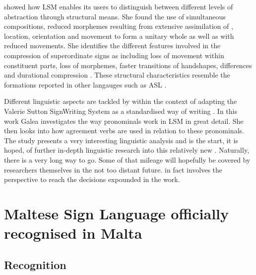 \documentclass[output=paper]{langsci/langscibook}
\begin{document}
\citet{m10} showed how LSM enables its users to distinguish
between different levels of abstraction through structural means.  She
found the use of simultaneous  compositions, reduced morphemes
resulting from extensive assimilation of , location,
orientation and movement to form a unitary whole as well as
 with reduced movements.  She identifies the different
features involved in the compression of superordinate signs as
including loss of movement within constituent parts, loss of
morphemes, faster transitions of handshapes,  differences and
durational compression \citep[150]{m10}.  These structural
characteristics resemble the  formations reported in other 
langauges such as ASL \citep[225 ff]{KB79}.

Different linguistic aspects are tackled by \citet{g14} within
the context of adapting the Valerie Sutton SignWriting System as a
standardised way of writing .  In this work Galea
investigates the way pronominals work in LSM in great detail.  She
then looks into how agreement verbs are used in relation to these
pronominals. The study presents a very interesting linguistic analysis
and is the start, it is hoped, of further in-depth linguistic research
into this relatively new .  Naturally, there is a very
long way to go.  Some of that mileage will hopefully be covered by
 researchers themselves in the not too distant future.
\citet{g14} in fact involves the  perspective to reach the
decisions expounded in the work.

\section{Maltese Sign Language officially recognised in Malta}

\subsection{Recognition}\label{sec:azzoparid:9.1}
\end{document}
